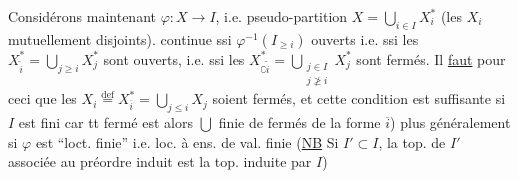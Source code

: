 Considérons maintenant $\varphi:X\longrightarrow I$, i.e.  pseudo-partition  $X=\bigcup_{i\in I}X_i^*$
(les $X_i$ mutuellement disjoints).  continue ssi
$\varphi^{-1}(I_{\geq i})$ ouverts
 i.e. ssi les $X_{\widetilde i}^*=\bigcup_{j\geq i}X_j^*$ sont ouverts, i.e. ssi les
$X_{\complement\widetilde i}^*=\bigcup_{\substack{j\in I\\j\not\geq i}}X_j^*$
sont fermés. Il \uline{faut} pour ceci que les
$X_i\overset{\mathrm{def}}=X_{\overline i}^*=\bigcup_{j\leq i}X_j$
soient fermés, et cette condition est suffisante
si $I$ est fini car tt fermé  est alors $\bigcup$ finie de fermés de la forme $\overline i$)
plus généralement si $\varphi$ est ``loct. finie'' i.e. loc. à ens. de val. finie
(\uline{NB} Si $I'\subset I$, la top. de $I'$ associée au préordre induit est la top. induite
par $I$)


